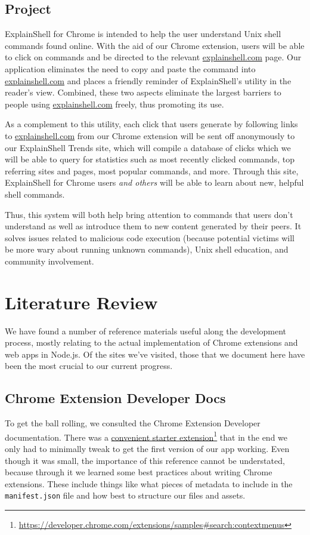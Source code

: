 \documentclass[11pt]{article}
\newcommand\fnurl[2]{%
\href{#1}{#2}\footnote{\url{#1}}%
}
\begin{document}
\subsection{Project}

ExplainShell for Chrome is intended to help the user understand Unix shell
commands found online. With the aid of our Chrome extension, users will be able
to click on commands and be directed to the relevant \url{explainshell.com} page.
Our application eliminates the need to copy and paste the command into
\url{explainshell.com} and places a friendly reminder of ExplainShell's utility
in the reader's view. Combined, these two aspects eliminate the largest
barriers to people using \url{explainshell.com} freely, thus promoting its use.

As a complement to this utility, each click that users generate by following
links to \url{explainshell.com} from our Chrome extension will be sent off
anonymously to our ExplainShell Trends site, which will compile a database of
clicks which we will be able to query for statistics such as most recently
clicked commands, top referring sites and pages, most popular commands, and
more. Through this site, ExplainShell for Chrome users \textit{and others} will
be able to learn about new, helpful shell commands.

Thus, this system will both help bring attention to commands that users don't
understand as well as introduce them to new content generated by their peers.
It solves issues related to malicious code execution (because potential victims
will be more wary about running unknown commands), Unix shell education, and
community involvement.

\section{Literature Review}

We have found a number of reference materials useful along the development
process, mostly relating to the actual implementation of Chrome extensions and
web apps in Node.js. Of the sites we've visited, those that we document here
have been the most crucial to our current progress.

\subsection{Chrome Extension Developer Docs}

To get the ball rolling, we consulted the Chrome Extension Developer
documentation. There was a
\fnurl{https://developer.chrome.com/extensions/samples#search:contextmenus}%
{convenient starter extension} that in the end we only had to minimally tweak to
get the first version of our app working. Even though it was small, the
importance of this reference cannot be understated, because through it we
learned some best practices about writing Chrome extensions. These include
things like what pieces of metadata to include in the \texttt{manifest.json}
file and how best to structure our files and assets.
\end{document}

